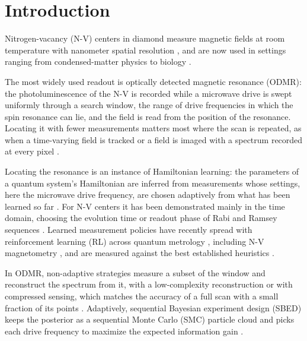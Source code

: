 \section{Introduction}
\label{sec:intro}

Nitrogen-vacancy (N-V) centers in diamond measure magnetic fields at room temperature with nanometer spatial
resolution \cite{balasubramanian2008,maze2008}, and are now used in settings ranging from condensed-matter physics to
biology \cite{doherty2013nv,rondin2014,degen2017}.

The most widely used readout is optically detected magnetic
resonance (ODMR): the photoluminescence of the N-V is recorded while a microwave drive is swept uniformly through a
search window, the range of drive frequencies in which the spin resonance can lie, and the field is read from the
position of the resonance. Locating it with fewer measurements matters most where the scan is repeated, as when a time-varying field is tracked \cite{haim2025} or a field is imaged with a
spectrum recorded at every pixel \cite{lesage2013,levine2019}.

Locating the resonance is an instance of Hamiltonian learning: the parameters of a quantum system's Hamiltonian are
inferred from measurements whose settings, here the microwave drive frequency, are chosen adaptively from what has
been learned so far \cite{granade2012,gebhart2023}. For N-V centers it has been demonstrated mainly in the time
domain, choosing the evolution time or readout phase of Rabi and Ramsey sequences
\cite{bonato2016,wang2017,santagati2019,mcmichael2021ramsey}. Learned measurement policies
\cite{hentschel2010,lumino2018} have recently spread with reinforcement learning (RL) across quantum metrology
\cite{xu2019,schuff2020,fiderer2021,xiao2022,cimini2023}, including N-V magnetometry
\cite{belliardo2024quantum,belliardo2024pra,guo2026}, and are measured against the best established heuristics
\cite{hentschel2010,fiderer2021,guo2026}.

In ODMR, non-adaptive strategies measure a subset of the window and reconstruct the spectrum from it, with a
low-complexity reconstruction \cite{luo2023} or with compressed sensing, which matches the accuracy of a full scan
with a small fraction of its points \cite{haim2025}. Adaptively, sequential Bayesian experiment design (SBED) keeps
the posterior as a sequential Monte Carlo (SMC) particle cloud \cite{granade2012} and picks each drive frequency to
maximize the expected information gain \cite{dushenko2020sbed}.

